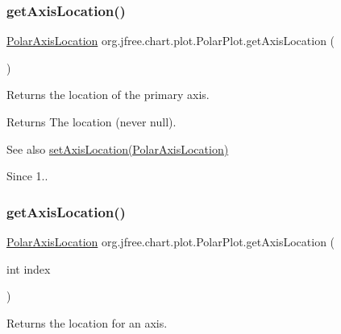 \subsubsection{\texorpdfstring{get\+Axis\+Location()}{getAxisLocation()}\hspace{0.1cm}{\footnotesize\ttfamily [1/2]}}
{\footnotesize\ttfamily \mbox{\hyperlink{classorg_1_1jfree_1_1chart_1_1plot_1_1_polar_axis_location}{Polar\+Axis\+Location}} org.\+jfree.\+chart.\+plot.\+Polar\+Plot.\+get\+Axis\+Location (\begin{DoxyParamCaption}{ }\end{DoxyParamCaption})}

Returns the location of the primary axis.

\begin{DoxyReturn}{Returns}
The location (never {\ttfamily null}).
\end{DoxyReturn}
\begin{DoxySeeAlso}{See also}
\mbox{\hyperlink{classorg_1_1jfree_1_1chart_1_1plot_1_1_polar_plot_a37bd0cf26d57341883faca5e3d4848c5}{set\+Axis\+Location(\+Polar\+Axis\+Location)}}
\end{DoxySeeAlso}
\begin{DoxySince}{Since}
1.. 
\end{DoxySince}
\mbox{\label{classorg_1_1jfree_1_1chart_1_1plot_1_1_polar_plot_ae5d05ba6ea1035092f706a79bf21ef1c}} 
\subsubsection{\texorpdfstring{get\+Axis\+Location()}{getAxisLocation()}\hspace{0.1cm}{\footnotesize\ttfamily [2/2]}}
{\footnotesize\ttfamily \mbox{\hyperlink{classorg_1_1jfree_1_1chart_1_1plot_1_1_polar_axis_location}{Polar\+Axis\+Location}} org.\+jfree.\+chart.\+plot.\+Polar\+Plot.\+get\+Axis\+Location (\begin{DoxyParamCaption}\item[{int}]{index }\end{DoxyParamCaption})}

Returns the location for an axis.


